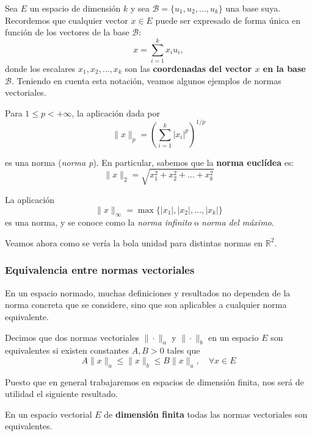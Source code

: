 Sea $E$ un espacio de dimensión $k$ y sea $\mathcal B = \{u_1,u_2,\dots,u_k\}$ una base suya. Recordemos que cualquier vector $x \in E$ puede ser expresado de forma única en función de los vectores de la base $\mathcal B$: $$x = \sum_{i=1}^k x_i u_i,$$ donde los escalares $x_1,x_2,\dots,x_k$ son las \textbf{coordenadas del vector $x$ en la base $\mathcal B$}. Teniendo en cuenta esta notación, veamos algunos ejemplos de normas vectoriales.

\begin{ejemplo} Para $1 \le p < + \infty$, la aplicación dada por $$\|x\|_p = \left( \sum_{i=1}^k |x_i|^p \right)^{1/p}$$

es una norma (\textit{norma p}). En particular, sabemos que la \textbf{norma euclídea} es: $$\|x\|_2 = \sqrt{x_1^2 + x_2^2 + \dots + x_k^2}$$

\end{ejemplo}

\begin{ejemplo}
	La aplicación $$\|x\|_\infty = \max\{|x_1|,|x_2|,\dots ,|x_k|\}$$ es una norma, y se conoce como la \textit{norma infinito} o \textit{norma del máximo}.
\end{ejemplo}


Veamos ahora como se vería la bola unidad para distintas normas en $\mathbb{R}^2$.


\subsubsection{Equivalencia entre normas vectoriales}

En un espacio normado, muchas definiciones y resultados no dependen de la norma concreta que se considere, sino que son aplicables a cualquier norma equivalente.

\begin{ndef} Decimos que dos normas vectoriales $\|\cdot\|_a$ y $\|\cdot\|_b$ en un espacio $E$ son equivalentes si existen constantes $A,B > 0$ tales que $$A\|x\|_a \le \|x\|_b \le B\|x\|_a,\quad \forall x \in E$$

\end{ndef}

Puesto que en general trabajaremos en espacios de dimensión finita, nos será de utilidad el siguiente resultado.

\begin{nth}
	En un espacio vectorial $E$ de \textbf{dimensión finita} todas las normas
vectoriales son equivalentes.
\end{nth}

